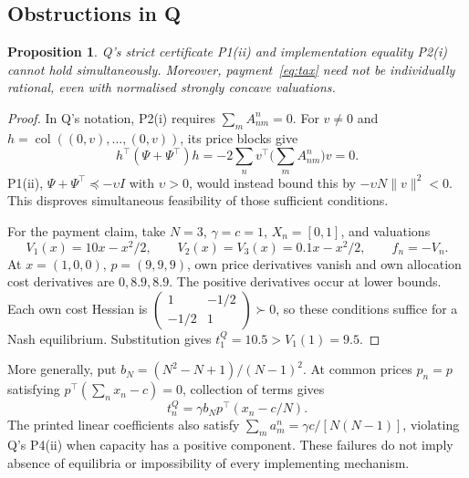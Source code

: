 \documentclass{article}
\newtheorem{proposition}[theorem]{Proposition}
\DeclareMathOperator{\col}{col}
\begin{document}
\subsection{Obstructions in Q}
\begin{proposition}\label{prop:failure}
Q's strict certificate P1(ii) and implementation equality P2(i) cannot
hold simultaneously. Moreover, payment~\eqref{eq:tax} need not be
individually rational, even with normalised strongly concave valuations.
\end{proposition}
\begin{proof}
In Q's notation, P2(i) requires \(\sum_m A_{nm}^n=0\).
For \(v\ne0\) and \(h=\col((0,v),\ldots,(0,v))\), its price blocks give
\[
 h^\top(\Psi+\Psi^\top)h
 =-2\sum_n v^\top\Big(\sum_m A_{nm}^n\Big)v=0.
\]
P1(ii), \(\Psi+\Psi^\top\preceq-\upsilon I\) with \(\upsilon>0\),
would instead bound this by \(-\upsilon N\|v\|^2<0\).
This disproves simultaneous feasibility of those sufficient conditions.

For the payment claim, take \(N=3\), \(\gamma=c=1\), \(X_n=[0,1]\),
and valuations
\[
 V_1(x)=10x-x^2/2,\qquad V_2(x)=V_3(x)=0.1x-x^2/2,
 \qquad f_n=-V_n.
\]
At \(x=(1,0,0)\), \(p=(9,9,9)\), own price derivatives vanish and
own allocation cost derivatives are \(0,8.9,8.9\). The positive derivatives
occur at lower bounds. Each own cost Hessian is
\(\left(\begin{smallmatrix}1&-1/2\\-1/2&1\end{smallmatrix}\right)\succ0\),
so these conditions suffice for a Nash equilibrium. Substitution gives
\(t_1^Q=10.5>V_1(1)=9.5\).
\end{proof}
More generally, put \(b_N=(N^2-N+1)/(N-1)^2\). At common prices
\(p_n=p\) satisfying \(p^\top(\sum_nx_n-c)=0\), collection of terms gives
\begin{equation}\label{eq:old-transfer}
 t_n^Q=\gamma b_Np^\top(x_n-c/N).
\end{equation}
The printed linear coefficients also satisfy
\(\sum_m a_m^n=\gamma c/[N(N-1)]\), violating Q's P4(ii) when
capacity has a positive component. These failures do not imply absence
of equilibria or impossibility of every implementing mechanism.
\end{document}
